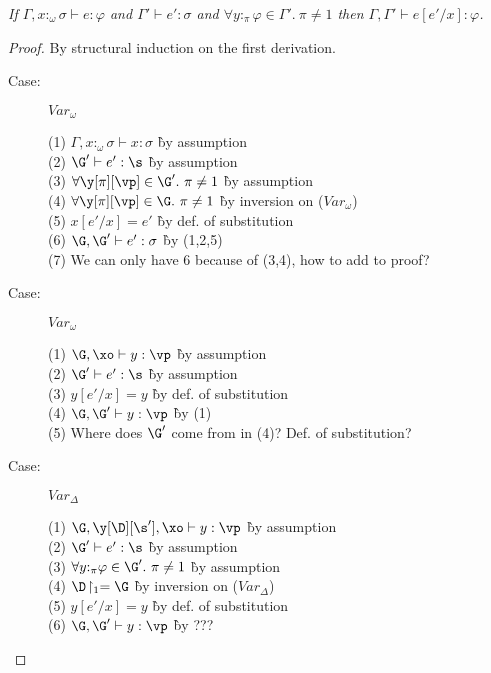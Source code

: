 \newcommand{\hasnolinearvars}[1]{\ensuremath{\forall y{:}_\pi\varphi \in #1 .~\pi \neq 1}}

\begin{lemma}
\emph{If $\Gamma, x{:}_\omega\sigma \vdash e : \varphi$ and $\Gamma' \vdash e' : \sigma$ and $\hasnolinearvars{\Gamma'}$ then $\Gamma,\Gamma' \vdash e[e'/x] : \varphi$.}
\end{lemma}

\begin{proof}
By structural induction on the first derivation.

\begin{description}

\item[Case:] $Var_\omega$
\begin{tabbing}
  (1) $\Gamma, x{:}_\omega\sigma \vdash x : \sigma$ \` by assumption\\
  (2) $\G' \vdash e' : \s$ \` by assumption\\
  (3) $\forall \y[\pi][\vp] \in \G'.~\pi \neq 1$ \` by assumption\\
  (4) $\forall \y[\pi][\vp] \in \G.~\pi \neq 1$ \` by inversion on ($Var_\omega$)\\
  (5) $x[e'/x] = e'$ \` by def. of substitution\\
  (6) $\G,\G' \vdash e' : \sigma$ \` by (1,2,5)\\
  (7) We can only have 6 because of (3,4), how to add to proof?
\end{tabbing}

\item[Case:] $Var_\omega$
\begin{tabbing}
  (1) $\G, \xo \vdash y : \vp$ \` by assumption\\
  (2) $\G' \vdash e' : \s$ \` by assumption\\
  (3) $y[e'/x] = y$ \` by def. of substitution\\
  (4) $\G,\G' \vdash y : \vp$ \` by (1)\\
  (5) Where does $\G'$ come from in (4)? Def. of substitution?
\end{tabbing}

\item[Case:] $Var_\Delta$
\begin{tabbing}
  (1) $\G, \y[\D][\s'], \xo \vdash y : \vp$ \` by assumption\\
  (2) $\G' \vdash e' : \s$ \` by assumption\\
  (3) $\hasnolinearvars{\G'}$ \` by assumption\\
  (4) $\D\!\upharpoonright_1 = \G$ \` by inversion on ($Var_\Delta$)\\
  (5) $y[e'/x] = y$ \` by def. of substitution\\
  (6) $\G,\G' \vdash y : \vp$ \` by ???
\end{tabbing}


\end{description}
\end{proof}
